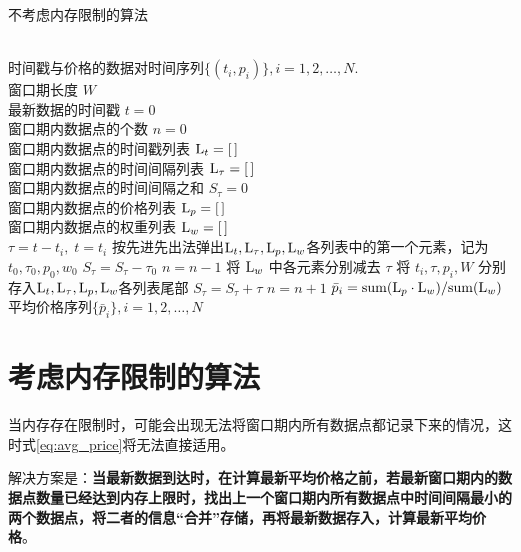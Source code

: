 \documentclass[titlepage=false]{ctexart}
\begin{document}
\begin{algorithm}
	\caption{不考虑内存限制的算法}
	\label{algo:nomemlimit}
	\begin{algorithmic}[1]
        \REQUIRE ~\\
            时间戳与价格的数据对时间序列$\{(t_i,p_i)\},i=1,2,\dots,N$.\\  %
            窗口期长度 $W$
		\ENSURE ~\\           %
            最新数据的时间戳 $t=0$\\
            窗口期内数据点的个数 $n=0$\\
            窗口期内数据点的时间戳列表 ${\rm L}_t=[\,]$\\
            窗口期内数据点的时间间隔列表 ${\rm L}_{\tau}=[\,]$\\
            窗口期内数据点的时间间隔之和 $S_{\tau}=0$\\
            窗口期内数据点的价格列表 ${\rm L}_p=[\,]$\\
            窗口期内数据点的权重列表 ${\rm L}_w=[\,]$\\
        \STATE $\tau=t-t_i,\;t=t_i$
            \STATE 按先进先出法弹出${\rm L}_{t},{\rm L}_{\tau},{\rm L}_{p},{\rm L}_{w}$各列表中的第一个元素，记为$t_0,\tau_0,p_0,w_0$
            \STATE $S_{\tau} = S_{\tau}-\tau_0$
            \STATE $n = n-1$
		\ENDWHILE
        \STATE 将 ${\rm L}_{w}$ 中各元素分别减去 $\tau$
        \STATE 将 $t_i,\tau,p_i,W$ 分别存入${\rm L}_{t},{\rm L}_{\tau},{\rm L}_{p},{\rm L}_{w}$各列表尾部
        \STATE $S_{\tau} = S_{\tau}+\tau$
        \STATE $n = n+1$
        \STATE $\bar{p}_i={{\rm sum}({\rm L}_{p}\cdot{\rm L}_{w})}/{{\rm sum}({\rm L}_{w})}$
        \ENDFOR
        \RETURN 平均价格序列$\{\bar{p}_i\},i=1,2,\dots,N$
	\end{algorithmic}
\end{algorithm}


\section{考虑内存限制的算法}

当内存存在限制时，可能会出现无法将窗口期内所有数据点都记录下来的情况，这时式\eqref{eq:avg_price}将无法直接适用。

解决方案是：\textbf{当最新数据到达时，在计算最新平均价格之前，若最新窗口期内的数据点数量已经达到内存上限时，找出上一个窗口期内所有数据点中时间间隔最小的两个数据点，将二者的信息“合并”存储，再将最新数据存入，计算最新平均价格}。
\end{document}
